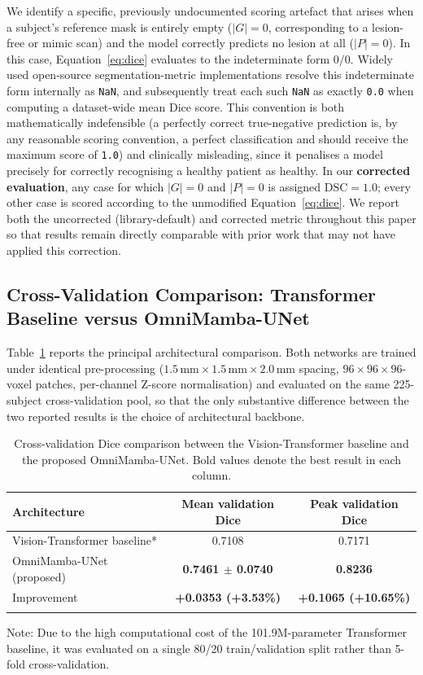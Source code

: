 \documentclass[pdflatex,sn-mathphys-num]{sn-jnl}
\begin{document}
We identify a specific, previously undocumented scoring
artefact that arises when a subject's reference mask is entirely empty
($|G|=0$, corresponding to a lesion-free or mimic scan) and the model
correctly predicts no lesion at all ($|P|=0$). In this case,
Equation~\eqref{eq:dice} evaluates to the indeterminate form $0/0$.
Widely used open-source segmentation-metric implementations resolve
this indeterminate form internally as \texttt{NaN}, and subsequently
treat each such \texttt{NaN} as exactly \texttt{0.0} when computing a
dataset-wide mean Dice score. This convention is both
mathematically indefensible (a perfectly correct true-negative
prediction is, by any reasonable scoring convention, a perfect
classification and should receive the maximum score of \texttt{1.0})
and clinically misleading, since it penalises a model precisely
for correctly recognising a healthy patient as healthy. In our
\textbf{corrected evaluation}, any case for which $|G|=0$ and
$|P|=0$ is assigned $\text{DSC}=1.0$; every other case is scored
according to the unmodified Equation~\eqref{eq:dice}. We report both
the uncorrected (library-default) and corrected metric throughout this
paper so that results remain directly comparable with prior work that
may not have applied this correction.

\subsection{Cross-Validation Comparison: Transformer Baseline versus OmniMamba-UNet}\label{ssec:main_compare}
Table~\ref{tab:main_comparison} reports the principal architectural
comparison. Both networks are trained under identical pre-processing
($1.5\,\text{mm}\times1.5\,\text{mm}\times2.0\,\text{mm}$ spacing,
$96 \times 96 \times 96$-voxel patches, per-channel Z-score normalisation) and evaluated
on the same 225-subject cross-validation pool, so that the only
substantive difference between the two reported results is the choice
of architectural backbone.

\begin{table}[t]
\caption{Cross-validation Dice comparison between the Vision-Transformer baseline and the proposed OmniMamba-UNet. Bold values denote the best result in each column.}
\label{tab:main_comparison}
\centering
\begin{tabular}{@{}lcc@{}}
\toprule
Architecture & Mean validation Dice & Peak validation Dice \\
\midrule
Vision-Transformer baseline* & 0.7108 & 0.7171 \\
OmniMamba-UNet (proposed) & \textbf{0.7461 $\pm$ 0.0740} & \textbf{0.8236} \\
\midrule
Improvement & \textbf{+0.0353 (+3.53\%)} & \textbf{+0.1065 (+10.65\%)} \\
\botrule
\end{tabular}
\vspace{4pt}
\par
\raggedright
\footnotesize *Note: Due to the high computational cost of the 101.9M-parameter Transformer baseline, it was evaluated on a single 80/20 train/validation split rather than 5-fold cross-validation.
\end{table}
\end{document}
